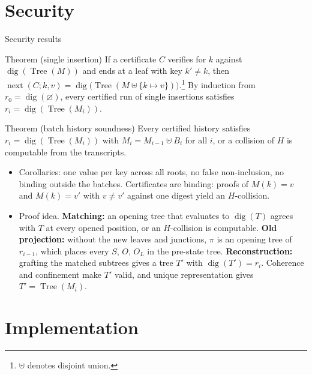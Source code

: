 \documentclass[aspectratio=169,10pt]{beamer}
\newcommand{\dig}{\operatorname{dig}}
\newcommand{\Tree}{\operatorname{Tree}}
\newcommand{\nxt}{\operatorname{next}}
\begin{document}
\section{Security}

\begin{frame}{Security results}
\begin{block}{Theorem (single insertion)}
\footnotesize
If a certificate $C$ verifies for $k$ against $\dig(\Tree(M))$ and ends at a leaf with key $k' \neq k$, then $\nxt(C;k,v) = \dig\big(\Tree(M \uplus \{k \mapsto v\})\big)$.\footnote{$\uplus$ denotes disjoint union.} By induction from $r_0 = \dig(\varnothing)$, every certified run of single insertions satisfies $r_i = \dig(\Tree(M_i))$.
\end{block}
\begin{block}{Theorem (batch history soundness)}
\footnotesize
Every certified history satisfies $r_i = \dig(\Tree(M_i))$ with $M_i = M_{i-1} \uplus B_i$ for all $i$, or a collision of $H$ is computable from the transcripts.
\end{block}
\small
\begin{itemize}
  \item Corollaries: one value per key across all roots, no false non-inclusion, no binding outside the batches. Certificates are binding: proofs of $M(k)=v$ and $M(k)=v'$ with $v \neq v'$ against one digest yield an $H$-collision.
  \item Proof idea. \textbf{Matching:} an opening tree that evaluates to $\dig(T)$ agrees with $T$ at every opened position, or an $H$-collision is computable. \textbf{Old projection:} without the new leaves and junctions, $\pi$ is an opening tree of $r_{i-1}$, which places every $S$, $O$, $O_L$ in the pre-state tree. \textbf{Reconstruction:} grafting the matched subtrees gives a tree $T'$ with $\dig(T') = r_i$. Coherence and confinement make $T'$ valid, and unique representation gives $T' = \Tree(M_i)$.
\end{itemize}
\end{frame}

\section{Implementation}
\end{document}
